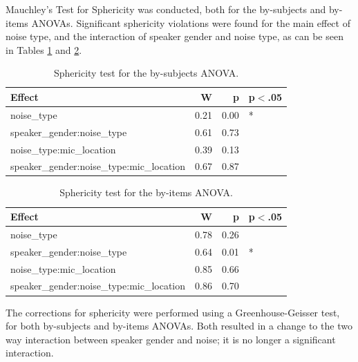 \documentclass[dissertation,copyright]{uathesis}
\begin{document}
Mauchley's Test for Sphericity was conducted, both for the by-subjects and by-items ANOVAs.  Significant sphericity violations were found for the main effect of noise type, and the interaction of speaker gender and noise type, as can be seen in Tables \ref{tab:anova1_subj_sph_test} and \ref{tab:anova1_item_sph_test}. 

\begin{table}[ht]
\centering
\begin{tabular}{lrrl}
  \hline
Effect & W & p & p$<$.05 \\ 
  \hline
noise\_type & 0.21 & 0.00 & * \\ 
  speaker\_gender:noise\_type & 0.61 & 0.73 &  \\ 
  noise\_type:mic\_location & 0.39 & 0.13 &  \\ 
  speaker\_gender:noise\_type:mic\_location & 0.67 & 0.87 &  \\ 
   \hline
\end{tabular}
\caption{Sphericity test for the by-subjects ANOVA.} 
\label{tab:anova1_subj_sph_test}
\end{table}
\begin{table}[ht]
\centering
\begin{tabular}{lrrl}
  \hline
Effect & W & p & p$<$.05 \\ 
  \hline
noise\_type & 0.78 & 0.26 &  \\ 
  speaker\_gender:noise\_type & 0.64 & 0.01 & * \\ 
  noise\_type:mic\_location & 0.85 & 0.66 &  \\ 
  speaker\_gender:noise\_type:mic\_location & 0.86 & 0.70 &  \\ 
   \hline
\end{tabular}
\caption{Sphericity test for the by-items ANOVA.} 
\label{tab:anova1_item_sph_test}
\end{table}

The corrections for sphericity were performed using a Greenhouse-Geisser test, for both by-subjects and by-items ANOVAs.  Both resulted in a change to the two way interaction between speaker gender and noise; it is no longer a significant interaction.
\end{document}
